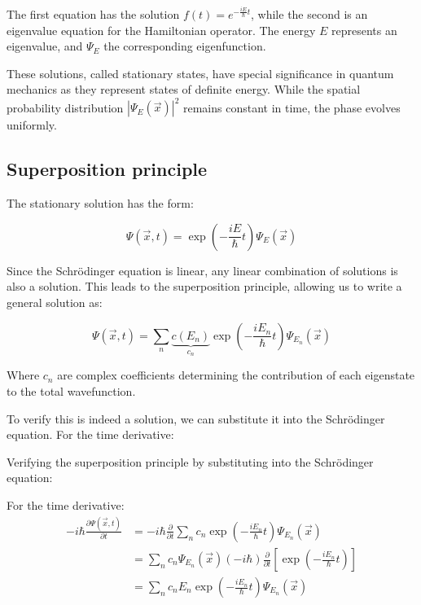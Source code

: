\documentclass[italian]{HKNdocument}
\begin{document}
The first equation has the solution $f(t) = e^{-\frac{iE}{\hbar}t}$, while the second is an eigenvalue equation for the Hamiltonian operator. The energy $E$ represents an eigenvalue, and $\Psi_E$ the corresponding eigenfunction.

These solutions, called stationary states, have special significance in quantum mechanics as they represent states of definite energy. While the spatial probability distribution $|\Psi_E(\vec{x})|^2$ remains constant in time, the phase evolves uniformly.

\subsection{Superposition principle}

The stationary solution has the form:

\begin{equation}
\Psi(\vec{x}, t) = \exp\left(-\frac{iE}{\hbar}t\right)\Psi_E(\vec{x})
\end{equation}

Since the Schrödinger equation is linear, any linear combination of solutions is also a solution. This leads to the superposition principle, allowing us to write a general solution as:

\begin{equation}
\Psi(\vec{x}, t) = \sum_n \underbrace{c(E_n)}_{c_n}\exp\left(-\frac{iE_n}{\hbar}t\right)\Psi_{E_n}(\vec{x})
\end{equation}

Where $c_n$ are complex coefficients determining the contribution of each eigenstate to the total wavefunction.

To verify this is indeed a solution, we can substitute it into the Schrödinger equation. For the time derivative:


Verifying the superposition principle by substituting into the Schrödinger equation:

For the time derivative:
\begin{align}
-i\hbar\frac{\partial\Psi(\vec{x},t)}{\partial t} &= -i\hbar\frac{\partial}{\partial t}\sum_n c_n\exp\left(-\frac{iE_n}{\hbar}t\right)\Psi_{E_n}(\vec{x}) \\
&= \sum_n c_n\Psi_{E_n}(\vec{x})(-i\hbar)\frac{\partial}{\partial t}\left[\exp\left(-\frac{iE_n}{\hbar}t\right)\right] \label{eq:2.7} \\
&= \sum_n c_nE_n\exp\left(-\frac{iE_n}{\hbar}t\right)\Psi_{E_n}(\vec{x})
\end{align}
\end{document}

